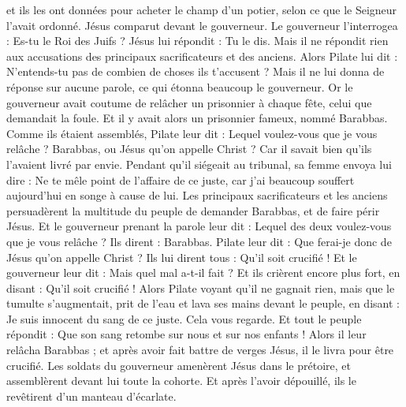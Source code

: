 \begin{multicols}{2}
et ils les ont données pour acheter le champ d'un potier, selon ce que le Seigneur l’avait ordonné{}.
Jésus comparut devant le gouverneur. Le gouverneur l'interrogea : Es-tu le Roi des Juifs ? Jésus lui répondit : Tu le dis.
Mais il ne répondit rien aux accusations des principaux sacrificateurs et des anciens.
Alors Pilate lui dit : N'entends-tu pas de combien de choses ils t’accusent ?
Mais il ne lui donna de réponse sur aucune parole, ce qui étonna beaucoup le gouverneur.
Or le gouverneur avait coutume de relâcher un prisonnier à chaque fête, celui que demandait la foule.
Et il y avait alors un prisonnier fameux, nommé Barabbas.
Comme ils étaient assemblés, Pilate leur dit : Lequel voulez-vous que je vous relâche ? Barabbas, ou Jésus qu'on appelle Christ ?
Car il savait bien qu'ils l'avaient livré par envie.
Pendant qu’il siégeait au tribunal, sa femme envoya lui dire : Ne te mêle point de l'affaire de ce juste, car j'ai beaucoup souffert aujourd'hui en songe à cause de lui.
Les principaux sacrificateurs et les anciens persuadèrent la multitude du peuple de demander Barabbas, et de faire périr Jésus.
Et le gouverneur prenant la parole leur dit : Lequel des deux voulez-vous que je vous relâche ? Ils dirent : Barabbas.
Pilate leur dit : Que ferai-je donc de Jésus qu'on appelle Christ ? Ils lui dirent tous : Qu’il soit crucifié !
Et le gouverneur leur dit : Mais quel mal a-t-il fait ? Et ils crièrent encore plus fort, en disant : Qu’il soit crucifié !
Alors Pilate voyant qu'il ne gagnait rien, mais que le tumulte s'augmentait, prit de l'eau et lava ses mains devant le peuple, en disant : Je suis innocent du sang de ce juste. Cela vous regarde.
Et tout le peuple répondit : Que son sang retombe sur nous et sur nos enfants !
Alors il leur relâcha Barabbas ; et après avoir fait battre de verges Jésus, il le livra pour être crucifié.
Les soldats du gouverneur amenèrent Jésus dans le prétoire, et assemblèrent devant lui toute la cohorte.
Et après l'avoir dépouillé, ils le revêtirent d’un manteau d'écarlate.

\end{multicols}
